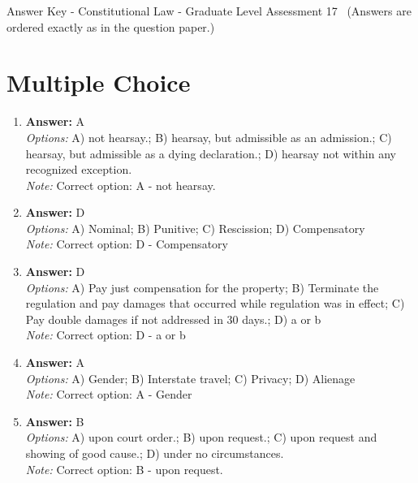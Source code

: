 \documentclass[12pt]{article}
\begin{document}
\begin{center}
Answer Key - Constitutional Law - Graduate Level Assessment 17 \
\small (Answers are ordered exactly as in the question paper.)
\end{center}

\section*{Multiple Choice}
\begin{enumerate}[label=\arabic*.]
\item \textbf{Answer:} A
\\ \textit{Options:} A) not hearsay.; B) hearsay, but admissible as an admission.; C) hearsay, but admissible as a dying declaration.; D) hearsay not within any recognized exception.
\\ \textit{Note:} Correct option: A - not hearsay.
\item \textbf{Answer:} D
\\ \textit{Options:} A) Nominal; B) Punitive; C) Rescission; D) Compensatory
\\ \textit{Note:} Correct option: D - Compensatory
\item \textbf{Answer:} D
\\ \textit{Options:} A) Pay just compensation for the property; B) Terminate the regulation and pay damages that occurred while regulation was in effect; C) Pay double damages if not addressed in 30 days.; D) a or b
\\ \textit{Note:} Correct option: D - a or b
\item \textbf{Answer:} A
\\ \textit{Options:} A) Gender; B) Interstate travel; C) Privacy; D) Alienage
\\ \textit{Note:} Correct option: A - Gender
\item \textbf{Answer:} B
\\ \textit{Options:} A) upon court order.; B) upon request.; C) upon request and showing of good cause.; D) under no circumstances.
\\ \textit{Note:} Correct option: B - upon request.
\end{enumerate}
\end{document}
